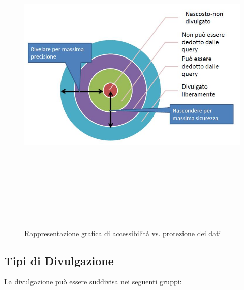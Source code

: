 \begin{figure}[htbp]

	\centering

	{\includegraphics[height=15cm, width=12cm, keepaspectratio]{Immagini/Appendice1/prot_dati_03.jpg}}
				\caption{Rappresentazione grafica di accessibilità vs. protezione dei dati \label{fig:protezione_vs_accessibilita}}

\end{figure}

\subsection{Tipi di Divulgazione}
La divulgazione può essere suddivisa nei seguenti gruppi:

